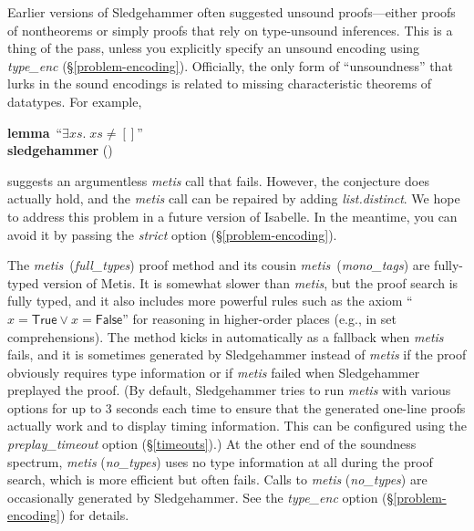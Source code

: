 \documentclass[a4paper,12pt]{article}
\newcommand\const[1]{\textsf{#1}}
\begin{document}

Earlier versions of Sledgehammer often suggested unsound proofs---either proofs
of nontheorems or simply proofs that rely on type-unsound inferences. This
is a thing of the pass, unless you explicitly specify an unsound encoding
using \textit{type\_enc} (\S\ref{problem-encoding}).
%
Officially, the only form of ``unsoundness'' that lurks in the sound
encodings is related to missing characteristic theorems of datatypes. For
example,

\prew
\textbf{lemma}~``$\exists \mathit{xs}.\; \mathit{xs} \neq []$'' \\
\textbf{sledgehammer} ()
\postw

suggests an argumentless \textit{metis} call that fails. However, the conjecture
does actually hold, and the \textit{metis} call can be repaired by adding
\textit{list.distinct}.
%
We hope to address this problem in a future version of Isabelle. In the
meantime, you can avoid it by passing the \textit{strict} option
(\S\ref{problem-encoding}).


The \textit{metis}~(\textit{full\_types}) proof method
and its cousin \textit{metis}~(\textit{mono\_tags}) are fully-typed
version of Metis. It is somewhat slower than \textit{metis}, but the proof
search is fully typed, and it also includes more powerful rules such as the
axiom ``$x = \const{True} \mathrel{\lor} x = \const{False}$'' for reasoning in
higher-order places (e.g., in set comprehensions). The method kicks in
automatically as a fallback when \textit{metis} fails, and it is sometimes
generated by Sledgehammer instead of \textit{metis} if the proof obviously
requires type information or if \textit{metis} failed when Sledgehammer
preplayed the proof. (By default, Sledgehammer tries to run \textit{metis} with
various options for up to 3 seconds each time to ensure that the generated
one-line proofs actually work and to display timing information. This can be
configured using the \textit{preplay\_timeout} option (\S\ref{timeouts}).)
%
At the other end of the soundness spectrum, \textit{metis} (\textit{no\_types})
uses no type information at all during the proof search, which is more efficient
but often fails. Calls to \textit{metis} (\textit{no\_types}) are occasionally
generated by Sledgehammer.
%
See the \textit{type\_enc} option (\S\ref{problem-encoding}) for details.
\end{document}
